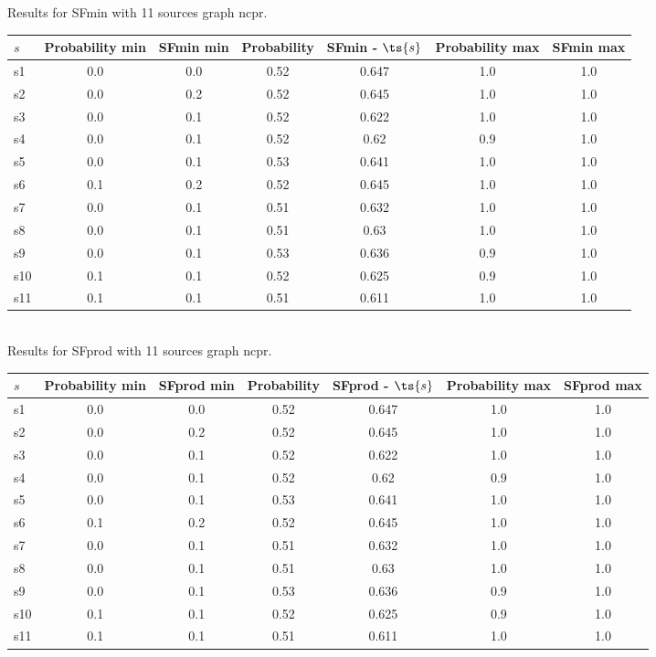 \documentclass{article}
\begin{document}
\noindent Results for SFmin with 11 sources graph ncpr.

\noindent\begin{tabular}{|l|c|c|c|c|c|c|}
\hline
$s$& Probability min & SFmin min & Probability & SFmin - $\ts{s}$ & Probability max & SFmin max\\
\hline
s1 &0.0 & 0.0 & 0.52 & 0.647 & 1.0 & 1.0\\
\hline
s2 &0.0 & 0.2 & 0.52 & 0.645 & 1.0 & 1.0\\
\hline
s3 &0.0 & 0.1 & 0.52 & 0.622 & 1.0 & 1.0\\
\hline
s4 &0.0 & 0.1 & 0.52 & 0.62 & 0.9 & 1.0\\
\hline
s5 &0.0 & 0.1 & 0.53 & 0.641 & 1.0 & 1.0\\
\hline
s6 &0.1 & 0.2 & 0.52 & 0.645 & 1.0 & 1.0\\
\hline
s7 &0.0 & 0.1 & 0.51 & 0.632 & 1.0 & 1.0\\
\hline
s8 &0.0 & 0.1 & 0.51 & 0.63 & 1.0 & 1.0\\
\hline
s9 &0.0 & 0.1 & 0.53 & 0.636 & 0.9 & 1.0\\
\hline
s10 &0.1 & 0.1 & 0.52 & 0.625 & 0.9 & 1.0\\
\hline
s11 &0.1 & 0.1 & 0.51 & 0.611 & 1.0 & 1.0\\
\hline
\end{tabular}\\

\noindent Results for SFprod with 11 sources graph ncpr.

\noindent\begin{tabular}{|l|c|c|c|c|c|c|}
\hline
$s$& Probability min & SFprod min & Probability & SFprod - $\ts{s}$ & Probability max & SFprod max\\
\hline
s1 &0.0 & 0.0 & 0.52 & 0.647 & 1.0 & 1.0\\
\hline
s2 &0.0 & 0.2 & 0.52 & 0.645 & 1.0 & 1.0\\
\hline
s3 &0.0 & 0.1 & 0.52 & 0.622 & 1.0 & 1.0\\
\hline
s4 &0.0 & 0.1 & 0.52 & 0.62 & 0.9 & 1.0\\
\hline
s5 &0.0 & 0.1 & 0.53 & 0.641 & 1.0 & 1.0\\
\hline
s6 &0.1 & 0.2 & 0.52 & 0.645 & 1.0 & 1.0\\
\hline
s7 &0.0 & 0.1 & 0.51 & 0.632 & 1.0 & 1.0\\
\hline
s8 &0.0 & 0.1 & 0.51 & 0.63 & 1.0 & 1.0\\
\hline
s9 &0.0 & 0.1 & 0.53 & 0.636 & 0.9 & 1.0\\
\hline
s10 &0.1 & 0.1 & 0.52 & 0.625 & 0.9 & 1.0\\
\hline
s11 &0.1 & 0.1 & 0.51 & 0.611 & 1.0 & 1.0\\
\hline
\end{tabular}\\
\end{document}
